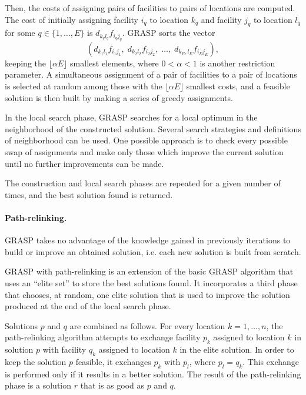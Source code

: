 Then, the costs of assigning pairs of facilities to pairs of locations are
computed. The cost of initially assigning facility $i_q$ to location $k_q$ and
facility $j_q$ to location $l_q$ for some $q\in\{1,\ldots,E\}$ is
$d_{k_q l_q} f_{i_q j_q}$. GRASP sorts the vector
\begin{displaymath}
(d_{k_1 l_1}  f_{i_1 j_1},\;
 d_{k_2 l_2}  f_{i_2 j_2},\; \ldots,\;
 d_{k_E, l_E} f_{i_E j_E}),
\end{displaymath}
keeping the $\lfloor \alpha E \rfloor$ smallest elements, where $0 < \alpha < 1$
is another restriction parameter. A simultaneous assignment of a pair of
facilities to a pair of locations is selected at random among those with the
$\lfloor \alpha E \rfloor$ smallest costs, and a feasible solution is then built
by making a series of greedy assignments.

In the local search phase, GRASP searches for a local optimum in the
neighborhood of the constructed solution. Several search strategies and
definitions of neighborhood can be used. One possible approach is to check every
possible swap of assignments and make only those which improve the current
solution until no further improvements can be made.

The construction and local search phases are repeated for a given number of
times, and the best solution found is returned.

\paragraph{Path-relinking.}
GRASP takes no advantage of the knowledge gained in previously iterations to
build or improve an obtained solution, i.e. each new solution is built from
scratch.

GRASP with path-relinking is an extension of the basic GRASP algorithm that uses
an ``elite set'' to store the best solutions found. It incorporates a third
phase that chooses, at random, one elite solution that is used to improve the
solution produced at the end of the local search phase.

Solutions $p$ and $q$ are combined as follows. For every location
$k = 1, \ldots, n$, the path-relinking algorithm attempts to exchange facility
$p_k$ assigned to location $k$ in  solution $p$ with facility $q_k$ assigned to
location $k$ in the elite solution. In order to keep the solution $p$ feasible,
it exchanges $p_k$ with $p_l$, where $p_l = q_k$. This exchange is performed
only if it results in a better solution. The result of the path-relinking phase
is a solution $r$ that is as good as $p$ and $q$.

